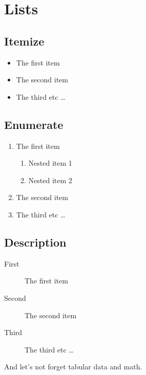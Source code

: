 \documentclass[11pt,twocolumn]{drd-article}
\begin{document}
\section{Lists}

\subsection{Itemize}

\begin{itemize}
  \item The first item
  \item The second item
  \item The third etc \ldots
\end{itemize}

\subsection{Enumerate}

\begin{enumerate}
  \item The first item
  \begin{enumerate}
    \item Nested item 1
    \item Nested item 2
  \end{enumerate}
  \item The second item
  \item The third etc \ldots
\end{enumerate}

\subsection{Description}

\begin{description}
  \item[First] The first item
  \item[Second] The second item
  \item[Third] The third etc \ldots
\end{description}

And let's not forget tabular data and math.
\end{document}
